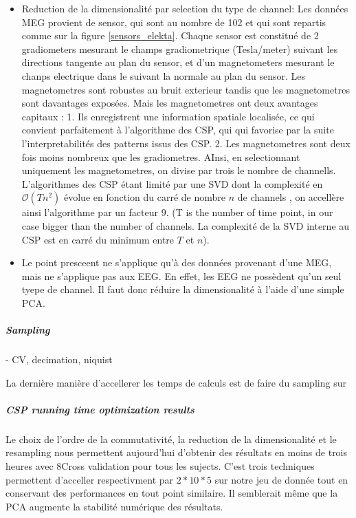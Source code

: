 \begin{itemize}
    \item Reduction de la dimensionalité par selection du type de channel: Les données MEG provient de sensor, qui sont au nombre de 102 et qui sont repartis comme sur la figure \ref{sensors_elekta}. Chaque sensor est constitué de 2 gradiometers mesurant le champs gradiometrique (Tesla/meter) suivant les directions tangente au plan du sensor, et d'un magnetometers mesurant le chanps electrique dans le suivant la normale au plan du sensor. Les magnetometres sont robustes au bruit exterieur tandis que les magnetometres sont davantages exposées. Mais les magnetometres ont deux avantages capitaux : 1. Ils enregistrent une information spatiale localisée, ce qui convient parfaitement à l'algorithme des CSP, qui qui favorise par la suite l'interpretabilités des patterns issus des CSP. 2. Les magnetometres sont deux fois moins nombreux que les gradiometres. AInsi, en selectionnant uniquement les magnetometres, on divise par trois le nombre de channells. L'algorithmes des CSP étant limité par une SVD dont la complexité en $\mathcal{O}(T n^2)$ évolue en fonction du carré de nombre $n$ de channels \cite{dhillonalan}, on accellère ainsi l'algorithme par un facteur 9. (T is the number of time point, in our case bigger than the number of channels. La complexité de la SVD interne au CSP est en carré du minimum entre $T$ et $n$).
    \item Le point presceent ne s'applique qu'à des données provenant d'une MEG, mais ne s'applique pas aux EEG. En effet, les EEG ne possèdent qu'un seul tyepe de channel. Il faut donc réduire la dimensionalité à l'aide d'une simple PCA.
\end{itemize}


\subparagraph{Sampling}

- CV, decimation, niquist

La dernière manière d'accellerer les temps de calculs est de faire du sampling sur 


\subparagraph{CSP running time optimization results}

Le choix de l'ordre de la commutativité, la reduction de la dimensionalité et le resampling nous permettent aujourd'hui d'obtenir des résultats en moins de trois heures avec 8Cross validation pour tous les sujects. C'est trois techniques permettent d'acceller respectivment par $2*10*5$ sur notre jeu de donnée tout en conservant des performances en tout point similaire. Il semblerait même que la PCA augmente la stabilité numérique des résultats.


